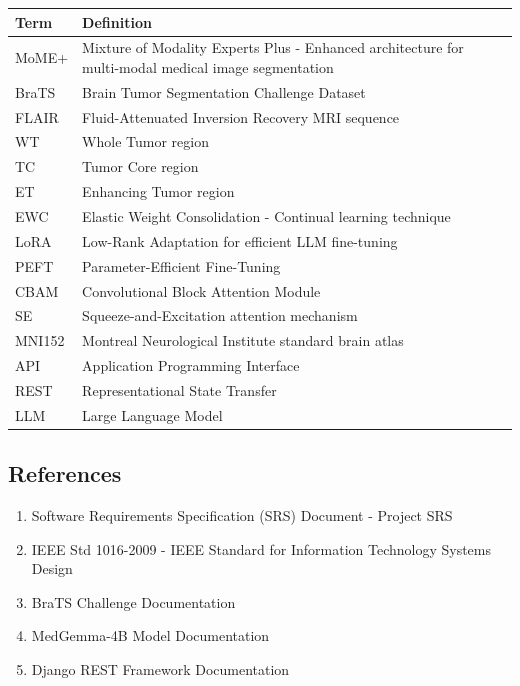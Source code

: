 \documentclass[12pt,a4paper]{article}
\begin{document}
\begin{table}[H]
\centering
\begin{tabularx}{\textwidth}{|l|X|}
\hline
\textbf{Term} & \textbf{Definition} \\
\hline
MoME+ & Mixture of Modality Experts Plus - Enhanced architecture for multi-modal medical image segmentation \\
\hline
BraTS & Brain Tumor Segmentation Challenge Dataset \\
\hline
FLAIR & Fluid-Attenuated Inversion Recovery MRI sequence \\
\hline
WT & Whole Tumor region \\
\hline
TC & Tumor Core region \\
\hline
ET & Enhancing Tumor region \\
\hline
EWC & Elastic Weight Consolidation - Continual learning technique \\
\hline
LoRA & Low-Rank Adaptation for efficient LLM fine-tuning \\
\hline
PEFT & Parameter-Efficient Fine-Tuning \\
\hline
CBAM & Convolutional Block Attention Module \\
\hline
SE & Squeeze-and-Excitation attention mechanism \\
\hline
MNI152 & Montreal Neurological Institute standard brain atlas \\
\hline
API & Application Programming Interface \\
\hline
REST & Representational State Transfer \\
\hline
LLM & Large Language Model \\
\hline
\end{tabularx}
\end{table}

\subsection{References}
\begin{enumerate}
    \item Software Requirements Specification (SRS) Document - Project SRS
    \item IEEE Std 1016-2009 - IEEE Standard for Information Technology Systems Design
    \item BraTS Challenge Documentation
    \item MedGemma-4B Model Documentation
    \item Django REST Framework Documentation
\end{enumerate}
\end{document}
